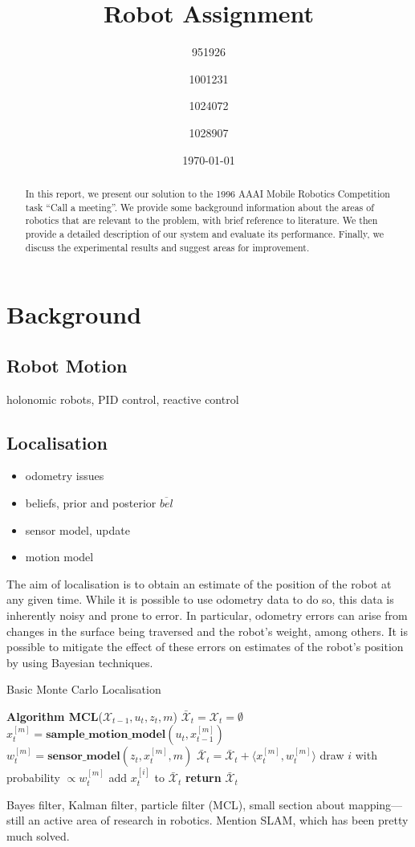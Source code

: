 \documentclass[conference]{IEEEtran}
\title{Robot Assignment}
\author{951926 \and 1001231 \and 1024072 \and 1028907}
\date{\today}
\begin{document}
\maketitle

\begin{abstract}
  In this report, we present our solution to the 1996 AAAI Mobile Robotics Competition task ``Call a meeting''\cite{AAAIcomp}. We provide some background information about the areas of robotics that are relevant to the problem, with brief reference to literature. We then provide a detailed description of our system and evaluate its performance. Finally, we discuss the experimental results and suggest areas for improvement.
\end{abstract}
\section{Background}
\subsection{Robot Motion}
holonomic robots, PID control, reactive control
\subsection{Localisation}
\begin{itemize}
\item odometry issues
\item beliefs, prior and posterior $\overline{bel}$
\item sensor model, update
\item motion model
\end{itemize}
The aim of localisation is to obtain an estimate of the position of the robot at any given time. While it is possible to use odometry data to do so, this data is inherently noisy and prone to error. In particular, odometry errors can arise from changes in the surface being traversed and the robot's weight, among others. It is possible to mitigate the effect of these errors on estimates of the robot's position by using Bayesian techniques. 
\begin{algorithm}
  \caption{Basic Monte Carlo Localisation\cite{thrun}}
  \label{alg:basicMCL}
  \begin{algorithmic}[1]
    \State \textbf{Algorithm MCL}\textnormal{($\mathcal{X}_{t-1}, u_t, z_t, m$)}
    \State $\bar{\mathcal{X}}_t=\mathcal{X}_t=\emptyset$
    \State $x_t^{[m]}=\textbf{sample\_motion\_model}(u_t,x_{t-1}^{[m]})$
    \State $w_t^{[m]}=\textbf{sensor\_model}(z_t,x_t^{[m]},m)$
    \State $\bar{\mathcal{X}}_t=\bar{\mathcal{X}}_t+\langle x_t^{[m]},w_t^{[m]}\rangle$
    \EndFor
    \State \textnormal{draw $i$ with probability $\propto w_t^{[m]}$}
    \State \textnormal{add $x_t^{[i]}$ to $\bar{\mathcal{X}}_t$}
    \EndFor
    \State \textbf{return} $\bar{\mathcal{X}}_t$
  \end{algorithmic}
\end{algorithm}
Bayes filter, Kalman filter, particle filter (MCL), small section about mapping---still an active area of research in robotics. Mention SLAM, which has been pretty much solved.
\end{document}
